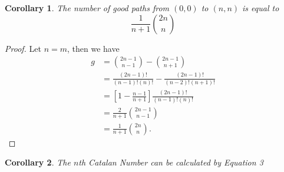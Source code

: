 \documentclass[letterpaper, 12pt]{article}
\newtheorem{corollary}{Corollary}[theorem]
\begin{document}
\begin{corollary}
    The number of good paths from $(0,0)$ to $(n,n)$ is equal to
    \begin{equation}
        \frac{1}{n+1}\binom{2n}{n}
    \end{equation}
\end{corollary}
\begin{proof}
    Let $n=m$, then we have
    \begin{align*}
        g &= \binom{2n-1}{n-1} - \binom{2n-1}{n+1}\\
        &= \frac{(2n-1)!}{(n-1)!(n)!} - \frac{(2n-1)!}{(n-2)!(n+1)!}\\
        &= \left[1-\frac{n-1}{n+1}\right]\frac{(2n-1)!}{(n-1)!(n)!}\\
        &= \frac{2}{n+1}\binom{2n-1}{n-1}\\
        &= \frac{1}{n+1}\binom{2n}{n}.
    \end{align*}
\end{proof}

\begin{corollary}
    The $n$th Catalan Number can be calculated by Equation 3
\end{corollary}
\end{document}
